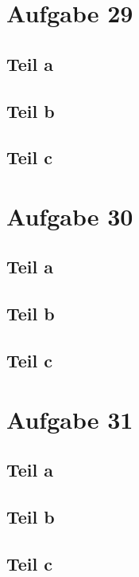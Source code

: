 \documentclass[10pt,a4paper]{article}
\begin{document}
\section{Aufgabe 29}

\subsection{Teil a}

\subsection{Teil b}

\subsection{Teil c}

\section{Aufgabe 30}

\subsection{Teil a}

\subsection{Teil b}

\subsection{Teil c}

\section{Aufgabe 31}

\subsection{Teil a}

\subsection{Teil b}

\subsection{Teil c}
\end{document}
